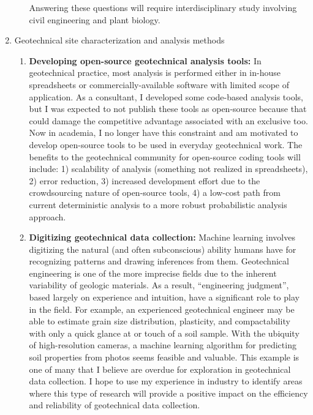 \documentclass[10pt,letterpaper]{article}
\begin{document}
\begin{enumerate}
\begin{enumerate}
Answering these questions will require interdisciplinary study involving civil engineering and plant biology.
\end{enumerate}
\item Geotechnical site characterization and analysis methods
\begin{enumerate}
\item \textbf{Developing open-source geotechnical analysis tools:} In geotechnical practice, most analysis is performed either in in-house spreadsheets or commercially-available software with limited scope of application.
As a consultant, I developed some code-based analysis tools, but I was expected to not publish these tools as open-source because that could damage the competitive advantage associated with an exclusive too.
Now in academia, I no longer have this constraint and am motivated to develop open-source tools to be used in everyday geotechnical work.
The benefits to the geotechnical community for open-source coding tools will include:
1) scalability of analysis (something not realized in spreadsheets),
2) error reduction,
3) increased development effort due to the crowdsourcing nature of open-source tools,
4) a low-cost path from current deterministic analysis to a more robust probabilistic analysis approach.
\item \textbf{Digitizing geotechnical data collection:} Machine learning involves digitizing the natural (and often subconscious) ability humans have for recognizing patterns and drawing inferences from them.
Geotechnical engineering is one of the more imprecise fields due to the inherent variability of geologic materials.
As a result, ``engineering judgment'', based largely on experience and intuition, have a significant role to play in the field.
For example, an experienced geotechnical engineer may be able to estimate grain size distribution, plasticity, and compactability with only a quick glance at or touch of a soil sample.
With the ubiquity of high-resolution cameras, a machine learning algorithm for predicting soil properties from photos seems feasible and valuable.
This example is one of many that I believe are overdue for exploration in geotechnical data collection.
I hope to use my experience in industry to identify areas where this type of research will provide a positive impact on the efficiency and reliability of geotechnical data collection.
\end{enumerate}
\end{enumerate}
\end{document}
